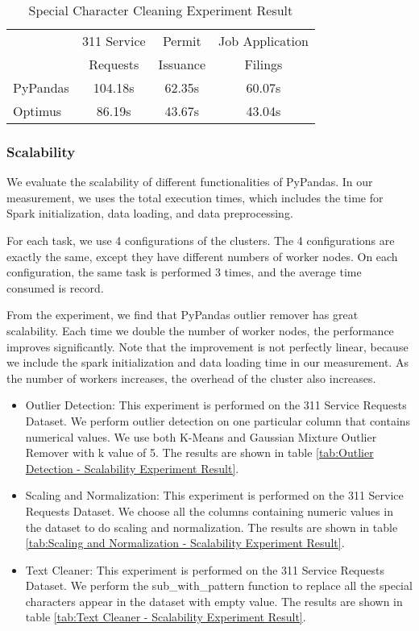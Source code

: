\documentclass[sigconf]{acmart}
\begin{document}
\begin{table}
\caption{Special Character Cleaning Experiment Result}   
\label{tab:Special Character Cleaning Experiment Result}
\begin{tabular}{lccc}   
                 & 311 Service  & Permit     & Job Application \\  
		 &	Requests  & Issuance  & Filings  \\ 
\hline
PyPandas   & 104.18s  & 62.35s   & 60.07s             \\ 
Optimus     & 86.19s    & 43.67s   & 43.04s             \\  
\end{tabular}   
\end{table}


\subsubsection{Scalability} We evaluate the scalability of different functionalities of PyPandas. In our measurement, we uses the total execution times, which includes the time for Spark initialization, data loading, and data preprocessing. 

For each task, we use 4 configurations of the clusters. The 4 configurations are exactly the same, except they have different numbers of worker nodes. On each configuration, the same task is performed 3 times, and the average time consumed is record. 

From the experiment, we find that PyPandas outlier remover has great scalability. Each time we double the number of worker nodes, the performance improves significantly. Note that the improvement is not perfectly linear, because we include the spark initialization and data loading time in our measurement. As the number of workers increases, the overhead of the cluster also increases.
\begin{itemize}
	\item{Outlier Detection}: This experiment is performed on the 311 Service Requests Dataset. We perform outlier detection on one particular column that contains numerical values. We use both K-Means and Gaussian Mixture Outlier Remover with k value of 5.  The results are shown in table \ref{tab:Outlier Detection - Scalability Experiment Result}.
	\item{Scaling and Normalization}: This experiment is performed on the 311 Service Requests Dataset. We choose all the columns containing numeric values in the dataset to do scaling and normalization. The results are shown in table \ref{tab:Scaling and Normalization - Scalability Experiment Result}.
	\item{Text Cleaner}: This experiment is performed on the 311 Service Requests Dataset. We perform the sub\_with\_pattern function to replace all the special characters appear in the dataset with empty value. The results are shown in table \ref{tab:Text Cleaner - Scalability Experiment Result}.
\end{itemize}
\end{document}
